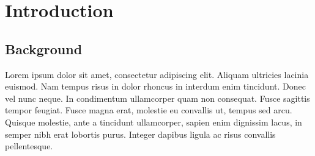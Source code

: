 
\chapter{Introduction} %

\label{ChapterX} %



\section{Background}

Lorem ipsum dolor sit amet, consectetur adipiscing elit. Aliquam ultricies lacinia euismod. Nam tempus risus in dolor rhoncus in interdum enim tincidunt. Donec vel nunc neque. In condimentum ullamcorper quam non consequat. Fusce sagittis tempor feugiat. Fusce magna erat, molestie eu convallis ut, tempus sed arcu. Quisque molestie, ante a tincidunt ullamcorper, sapien enim dignissim lacus, in semper nibh erat lobortis purus. Integer dapibus ligula ac risus convallis pellentesque. \cite{yee2009native}

